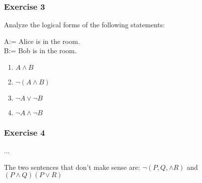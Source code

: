\begin{questions}
\subsubsection{Exercise 3}

\question Analyze the logical forms of the following statements:

A:= Alice is in the room. \\
B:= Bob is in the room.

\begin{solution}
    \begin{enumerate}[label=(\alph*)]
        \item $A \wedge B$
        \item $\neg (A \wedge B)$
        \item $\neg A \vee \neg B$
        \item $\neg A \wedge \neg B$
    \end{enumerate}
\end{solution}


\subsubsection{Exercise 4}
\question ...

\begin{solution}
    The two sentences that don't make sense are:
    $\neg(P, Q, \wedge R)$ and \\
    $(P \wedge Q)(P\vee R)$
\end{solution}


\end{questions}
